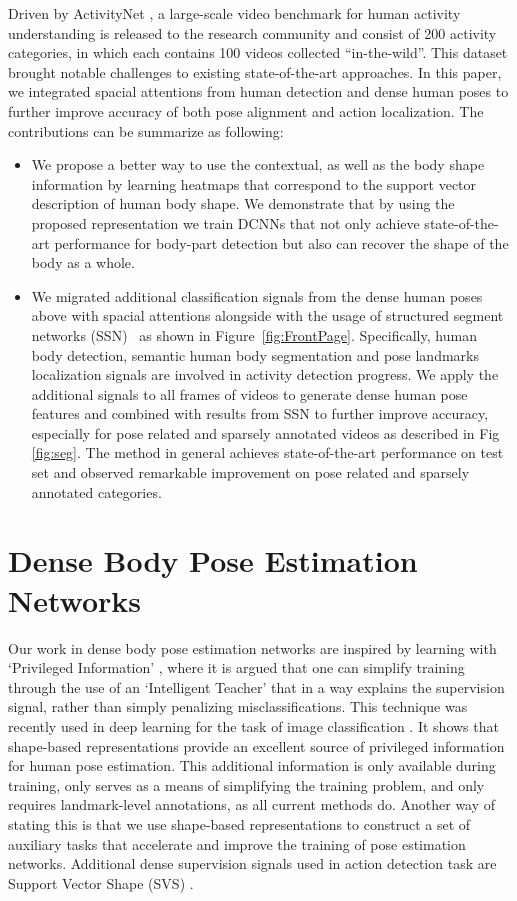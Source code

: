 Driven by ActivityNet \cite{caba2015activitynet}, a large-scale video benchmark for human activity understanding is released to the research community and consist of 200 activity categories, in which each contains 100 videos collected ``in-the-wild''. This dataset brought notable challenges to existing state-of-the-art approaches. In this paper, we integrated spacial attentions from human detection and dense human poses to further improve accuracy of both pose alignment and action localization. The contributions can be summarize as following: 
\begin{itemize}
\item  We propose a better way to use the contextual, as well as the body shape information by learning heatmaps that correspond to the support vector description of human body shape. We demonstrate that by using the proposed representation we train DCNNs that not only achieve state-of-the-art performance for body-part detection but also can recover the shape of the body as a whole.

\item  We migrated additional classification signals from the dense human poses above with spacial attentions alongside with the usage of structured segment networks (SSN)~\cite{zhao2017temporal} as shown in Figure~\ref{fig:FrontPage}. Specifically, human body detection, semantic human body segmentation and pose landmarks localization signals are involved in activity detection progress. We apply the additional signals to all frames of videos to generate dense human pose features and combined with results from SSN to further improve accuracy, especially for pose related and sparsely annotated videos as described in Fig \ref{fig:seg}. The method in general achieves state-of-the-art performance on test set and observed remarkable improvement on pose related and sparsely annotated categories. 

\end{itemize}

\section{Dense Body Pose Estimation Networks}
Our work in dense body pose estimation networks are inspired by learning with `Privileged Information' \cite{VapnikV09,david16,ChenJFY17,zhou2016estimating}, where it is argued that one can simplify training through the use of an `Intelligent Teacher' that in a way explains the supervision signal, rather than simply penalizing misclassifications. This technique was recently used in deep learning for the task of image classification \cite{ChenJFY17}. It shows that shape-based representations provide an excellent source of privileged information for human pose estimation. This additional information is only available during training, only serves as a means of simplifying the training problem, and only requires landmark-level annotations, as all current methods do. Another way of stating this is that we use shape-based representations to construct a set of auxiliary tasks that accelerate and improve the training of pose estimation networks. Additional dense supervision signals used in action detection task are Support Vector Shape (SVS) \cite{van2013support}.

